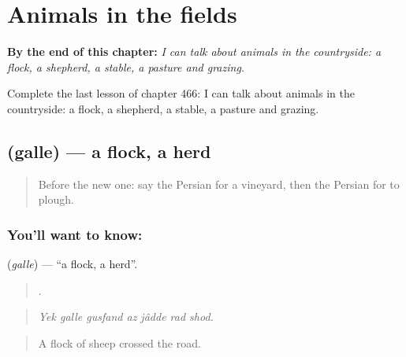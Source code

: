 
\chapter{Animals in the fields}
\label{ch:fa-animals-in-the-fields}

\begin{chapteropening}
\textbf{By the end of this chapter:} \emph{I can talk about animals in the countryside: a flock, a shepherd, a stable, a pasture and grazing.}

Complete the last lesson of chapter 466: I can talk about animals in the countryside: a flock, a shepherd, a stable, a pasture and grazing.
\end{chapteropening}

\section[\texorpdfstring{\fa{گله} (galle)}{گله (galle)}]{ (galle) — a flock, a herd}

\label{lesson:FA-C466-galle}



\begin{quote}
Before the new one: say the Persian for a vineyard, then the Persian for to plough.
\end{quote}

\subsection*{You'll want to know: }
\textbf{} (\emph{galle}) — \textquotedblleft{}a flock, a herd\textquotedblright{}.

\begin{quote}
      .
\end{quote}

\begin{quote}
\emph{Yek galle gusfand az jâdde rad shod.}
\end{quote}

\begin{quote}
A flock of sheep crossed the road.
\end{quote}


